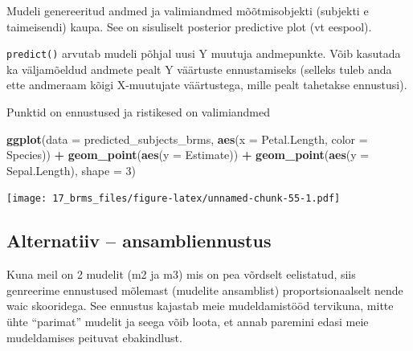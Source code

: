 \documentclass[]{book}
\newenvironment{Shaded}{\begin{snugshade}}{\end{snugshade}}
\newcommand{\DataTypeTok}[1]{\textcolor[rgb]{0.13,0.29,0.53}{#1}}
\newcommand{\DecValTok}[1]{\textcolor[rgb]{0.00,0.00,0.81}{#1}}
\newcommand{\KeywordTok}[1]{\textcolor[rgb]{0.13,0.29,0.53}{\textbf{#1}}}
\newcommand{\NormalTok}[1]{#1}
\newcommand{\OperatorTok}[1]{\textcolor[rgb]{0.81,0.36,0.00}{\textbf{#1}}}
\newcommand{\StringTok}[1]{\textcolor[rgb]{0.31,0.60,0.02}{#1}}
\begin{document}
Mudeli genereeritud andmed ja valimiandmed mõõtmisobjekti (subjekti e taimeisendi) kaupa. See on sisuliselt posterior predictive plot (vt eespool).

\begin{Shaded}
\end{Shaded}

\texttt{predict()} arvutab mudeli põhjal uusi Y muutuja andmepunkte. Võib kasutada ka väljamõeldud andmete pealt Y väärtuste ennustamiseks (selleks tuleb anda ette andmeraam kõigi X-muutujate väärtustega, mille pealt tahetakse ennustusi).

Punktid on ennustused ja ristikesed on valimiandmed

\begin{Shaded}
\begin{Highlighting}[]
\KeywordTok{ggplot}\NormalTok{(}\DataTypeTok{data =}\NormalTok{ predicted_subjects_brms, }\KeywordTok{aes}\NormalTok{(}\DataTypeTok{x =}\NormalTok{ Petal.Length, }\DataTypeTok{color =}\NormalTok{ Species)) }\OperatorTok{+}
\StringTok{  }\KeywordTok{geom_point}\NormalTok{(}\KeywordTok{aes}\NormalTok{(}\DataTypeTok{y =}\NormalTok{ Estimate)) }\OperatorTok{+}
\StringTok{  }\KeywordTok{geom_point}\NormalTok{(}\KeywordTok{aes}\NormalTok{(}\DataTypeTok{y =}\NormalTok{ Sepal.Length), }\DataTypeTok{shape =} \DecValTok{3}\NormalTok{)}
\end{Highlighting}
\end{Shaded}

\texttt{[image: 17\_brms\_files/figure-latex/unnamed-chunk-55-1.pdf]}

\hypertarget{alternatiiv-ansambliennustus}{%
\subsection{Alternatiiv -- ansambliennustus}\label{alternatiiv-ansambliennustus}}

Kuna meil on 2 mudelit (m2 ja m3) mis on pea võrdselt eelistatud, siis genreerime ennustused mõlemast (mudelite ansamblist) proportsionaalselt nende waic skooridega. See ennustus kajastab meie mudeldamistööd tervikuna, mitte ühte ``parimat'' mudelit ja seega võib loota, et annab paremini edasi meie mudeldamises peituvat ebakindlust.
\end{document}

